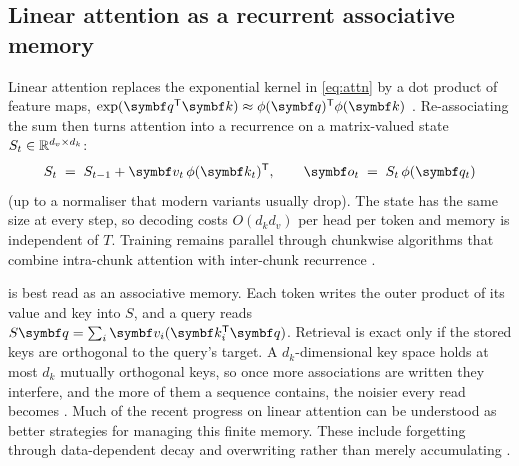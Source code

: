 \documentclass[10pt,a4paper]{article}
\begin{document}
\subsection{Linear attention as a recurrent associative memory}
Linear attention replaces the exponential kernel in \cref{eq:attn} by a dot product of feature maps,
$\exp(\vect{q}^{\T}\vect{k})\approx\phi(\vect{q})^{\T}\phi(\vect{k})$
\citep{katharopoulos2020transformers}. Re-associating the sum then turns attention into a recurrence
on a matrix-valued state $S_t\in\mathbb{R}^{d_v\times d_k}$:
\begin{equation}\label{eq:linattn}
  S_t \;=\; S_{t-1} + \vect{v}_t\,\phi(\vect{k}_t)^{\T},
  \qquad
  \vect{o}_t \;=\; S_t\,\phi(\vect{q}_t)
\end{equation}
(up to a normaliser that modern variants usually drop). The state has the same size at every step,
so decoding costs $O(d_k d_v)$ per head per token and memory is independent of $T$. Training remains
parallel through chunkwise algorithms that combine intra-chunk attention with inter-chunk recurrence
\citep{yang2024gla}.

 is best read as an associative memory. Each token writes the outer product of
its value and key into $S$, and a query reads $S\vect{q}=\sum_i\vect{v}_i(\vect{k}_i^{\T}\vect{q})$.
Retrieval is exact only if the stored keys are orthogonal to the query's target. A $d_k$-dimensional
key space holds at most $d_k$ mutually orthogonal keys, so once more associations are written they
interfere, and the more of them a sequence contains, the noisier every read becomes
\citep{schlag2021linear}. Much of the recent progress on linear attention can be understood as
better strategies for managing this finite memory. These include forgetting through data-dependent
decay \citep{yang2024gla,dao2024transformers} and overwriting rather than merely accumulating
\citep{schlag2021linear,yang2024deltanet}.
\end{document}
